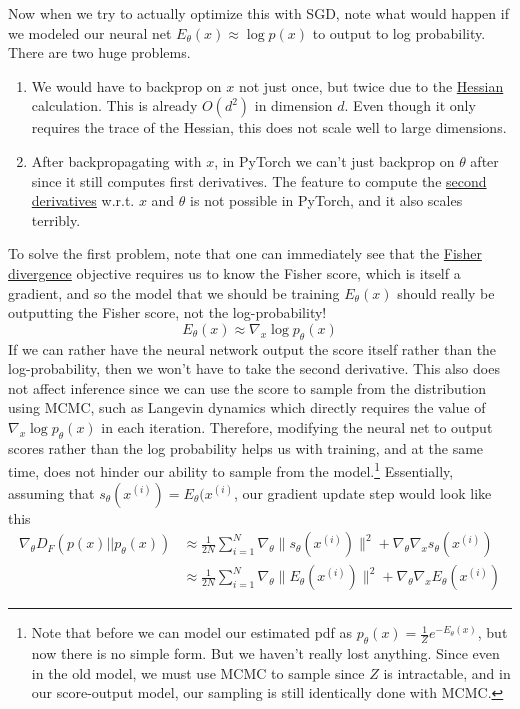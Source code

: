 \documentclass{article}
\begin{document}
    Now when we try to actually optimize this with SGD, note what would happen if we modeled our neural net $E_\theta(x) \approx \log p(x)$ to output to log probability. There are two huge problems. 
    \begin{enumerate}
      \item We would have to backprop on $x$ not just once, but twice due to the \hyperref[mv-def:hessian]{Hessian} calculation. This is already $O(d^2)$ in dimension $d$. Even though it only requires the trace of the Hessian, this does not scale well to large dimensions. 
      \item After backpropagating with $x$, in PyTorch we can't just backprop on $\theta$ after since it still computes first derivatives. The feature to compute the \hyperref[mv-def:second-derivative]{second derivatives} w.r.t. $x$ and $\theta$ is not possible in PyTorch, and it also scales terribly. 
    \end{enumerate} 
    To solve the first problem, note that one can immediately see that the \hyperref[def:fisher-divergence]{Fisher divergence} objective requires us to know the Fisher score, which is itself a gradient, and so the model that we should be training $E_\theta (x)$ should really be outputting the Fisher score, not the log-probability! 
    \begin{equation}
      E_\theta (x) \approx \nabla_x \log p_\theta (x)
    \end{equation} 
    If we can rather have the neural network output the score itself rather than the log-probability, then we won't have to take the second derivative. This also does not affect inference since we can use the score to sample from the distribution using MCMC, such as Langevin dynamics which directly requires the value of $\nabla_x \log p_\theta (x)$ in each iteration. Therefore, modifying the neural net to output scores rather than the log probability helps us with training, and at the same time, does not hinder our ability to sample from the model.\footnote{Note that before we can model our estimated pdf as $p_\theta (x) = \frac{1}{Z} e^{-E_\theta (x)}$, but now there is no simple form. But we haven't really lost anything. Since even in the old model, we must use MCMC to sample since $Z$ is intractable, and in our score-output model, our sampling is still identically done with MCMC.} Essentially, assuming that $s_\theta (x^{(i)}) = E_\theta (x^{(i)}$, our gradient update step would look like this
    \begin{align}
      \nabla_\theta  D_F (p(x) || p_\theta (x)) & \approx \frac{1}{2N} \sum_{i=1}^N \nabla_\theta \| s_\theta (x^{(i)}) \|^2 + \nabla_\theta \nabla_x s_\theta (x^{(i)}) \\ 
                                                & \approx \frac{1}{2N} \sum_{i=1}^N \nabla_\theta \| E_\theta (x^{(i)}) \|^2 + \nabla_\theta \nabla_x E_\theta (x^{(i)})
    \end{align}
\end{document}

